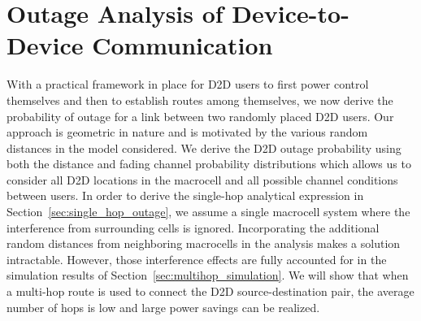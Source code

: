 \documentclass[10pt, final, journal, letterpaper,oneside, twocolumn]{IEEEtran}
\begin{document}
\section{Outage Analysis of Device-to-Device Communication}
\label{sec:singlehopd2d}
With a practical framework in place for D2D users to first power control themselves and then to establish routes among themselves, we now derive the probability of outage for a link between two randomly placed D2D users.  Our approach is geometric in nature and is motivated by the various random distances in the model considered.  We derive the D2D outage probability using both the distance and fading channel probability distributions which allows us to consider all D2D locations in the macrocell and all possible channel conditions between users.  In order to derive the single-hop analytical expression in Section~\ref{sec:single_hop_outage}, we assume a single macrocell system where the interference from surrounding cells is ignored.  Incorporating the additional random distances from neighboring macrocells in the analysis makes a solution intractable.  However, those interference effects are fully accounted for in the simulation results of Section~\ref{sec:multihop_simulation}.  We will show that when a multi-hop route is used to connect the D2D source-destination pair, the average number of hops is low and large power savings can be realized.  
\end{document}
